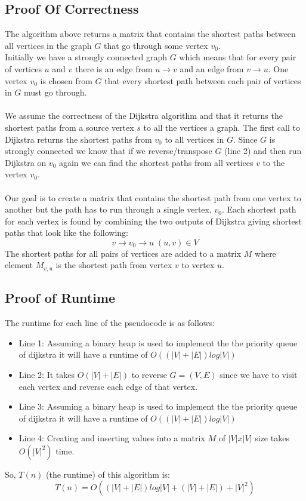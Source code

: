 \documentclass[12pt]{article}
\begin{document}
\subsection*{Proof Of Correctness}
The algorithm above returns a matrix that contains the shortest paths between all vertices in the graph $G$ that go through some vertex $v_0$.\\
Initially we have a strongly connected graph $G$ which means that for every pair of vertices $u$ and $v$ there is an edge from $u \rightarrow v$ and an edge from $v \rightarrow u$.
One vertex $v_0$ is chosen from $G$ that every shortest path between each pair of vertices in $G$ must go through.  \\
\\
We assume the correctness of the Dijkstra algorithm and that it returns the shortest paths from a source vertex $s$ to all the vertices a graph.  The first call to Dijkstra returns the shortest paths from $v_0$ to all vertices
in $G$.  Since $G$ is strongly connected we know that if we reverse/transpose $G$ (line 2) and then run Dijkstra on $v_0$ again we can find the shortest paths from all vertices $v$ to the vertex $v_0$.  \\
\\
Our goal is to create a matrix that contains the shortest path from one vertex to another but the path has to run through a single vertex, $v_0$.  Each shortest path for each vertex is found by combining the two outputs of Dijkstra giving shortest paths that look like the following:
$$
v \rightarrow v_0 \rightarrow u\;(u,v) \in V
$$
The shortest paths for all pairs of vertices are added to a matrix $M$ where element $M_{v,u}$ is the shortest path from vertex $v$ to vertex $u$. 
\subsection*{Proof of Runtime}
The runtime for each line of the pseudocode is as follows:
\begin{itemize}
\item Line 1: Assuming a binary heap is used to implement the the priority queue of dijkstra it will have a runtime of $O((|V|+|E|)log|V|)$
\item Line 2: It takes $O(|V|+|E|)$ to reverse $G=(V,E)$ since we have to visit each vertex and reverse each edge of that vertex.
\item Line 3: Assuming a binary heap is used to implement the the priority queue of dijkstra it will have a runtime of $O((|V|+|E|)log|V|)$
\item Line 4: Creating and inserting values into a matrix $M$ of $|V|x|V|$ size takes $O(|V|^2)$ time.
\end{itemize}
So, $T(n)$ (the runtime) of this algorithm is:
$$
T(n) = O((|V|+|E|)log|V| + (|V|+|E|) + |V|^2)
$$
\end{document}
